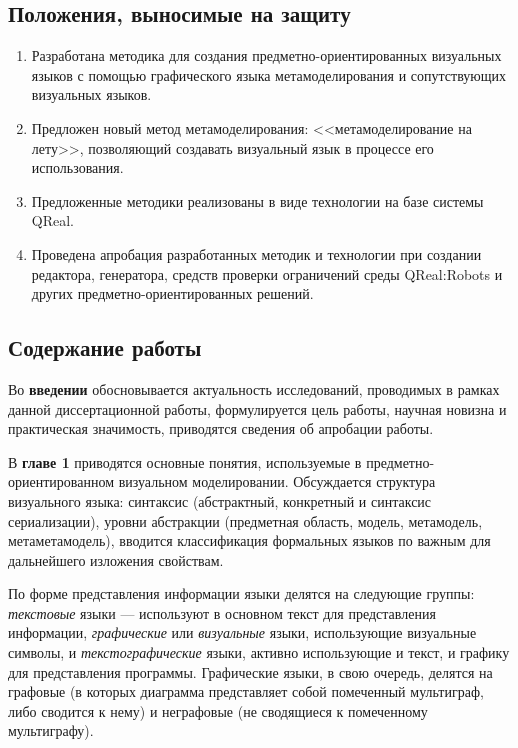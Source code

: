 \subsection*{\Large Положения, выносимые на защиту}
\begin{enumerate}
	\item Разработана методика для создания предметно-ориентированных визуальных языков с помощью 
		графического языка метамоделирования и сопутствующих визуальных языков.
	\item Предложен новый метод метамоделирования: <<метамоделирование на лету>>, позволяющий
		создавать визуальный язык в процессе его использования.
	\item Предложенные методики реализованы в виде технологии на базе системы QReal.
	\item Проведена апробация разработанных методик и технологии при создании редактора, 
		генератора, средств проверки ограничений среды QReal:Robots и других предметно-ориентированных 
		решений.
\end{enumerate}

\subsection*{\Large Содержание работы}
Во \textbf{введении} обосновывается актуальность исследований, проводимых в рамках 
данной диссертационной работы, формулируется цель работы, научная новизна и практическая 
значимость, приводятся сведения об апробации работы.

В \textbf{главе 1} приводятся основные понятия, используемые в 
предметно-ориентированном визуальном моделировании. Обсуждается структура 
визуального языка: синтаксис (абстрактный, конкретный и синтаксис сериализации), 
уровни абстракции (предметная область, модель, метамодель, метаметамодель), вводится 
классификация формальных языков по важным для дальнейшего изложения свойствам.

По форме представления информации языки делятся на следующие группы: \textit{текстовые} языки 
--- используют в основном текст для представления информации, \textit{графические} или 
\textit{визуальные} языки, использующие визуальные символы, и \textit{текстографические} языки,
активно использующие и текст, и графику для представления программы. Графические языки, в свою очередь, 
делятся на графовые (в которых диаграмма представляет собой помеченный мультиграф, либо сводится к нему)
и неграфовые (не сводящиеся к помеченному мультиграфу).

